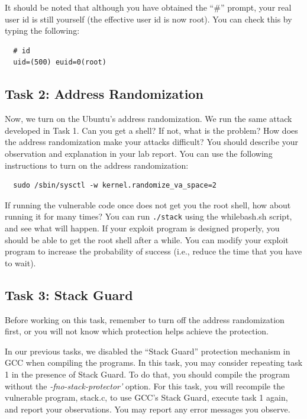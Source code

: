 It should be noted that although you have obtained the ``\#'' prompt, 
your real user id is still yourself (the effective user id is now
root). You can check this by typing the following:
\begin{verbatim}
  # id
  uid=(500) euid=0(root)
\end{verbatim}




\subsection{Task 2: Address Randomization}

Now, we turn on the Ubuntu's address randomization.  We run the same attack
developed in Task 1. Can you get a shell? If not, what is the problem?
How does the address randomization make your attacks difficult?
You should describe your observation and explanation
in your lab report. You can use the following instructions to turn
on the address randomization:

\begin{verbatim}
  sudo /sbin/sysctl -w kernel.randomize_va_space=2
\end{verbatim}


If running the vulnerable code once does not get you the root shell, how 
about running it for many times? You can run {\tt ./stack} 
using the whilebash.sh script, and see what will happen. If your exploit
program is designed properly, you should be able to get the root shell
after a while. You can modify your exploit program to increase the
probability of success (i.e., reduce the time that you have to wait).

\subsection{Task 3: Stack Guard}

Before working on this task, remember to turn off the address
randomization first, or you will not know which protection helps 
achieve the protection.

In our previous tasks, we disabled the ``Stack Guard'' protection mechanism in GCC
when compiling the programs. In this task, you may consider repeating
task 1 in the presence of Stack Guard. To do that, you should compile
the program without the \emph{-fno-stack-protector'} option. For this
task, you will recompile the vulnerable program, stack.c, to use GCC's
Stack Guard, execute task 1 again, and report your observations. You
may report any error messages you observe.

